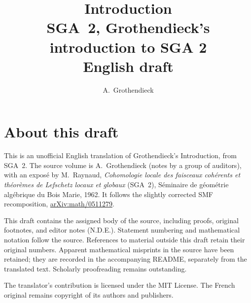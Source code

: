 \documentclass[11pt,a4paper,oneside]{amsbook}
\title[SGA~2, Grothendieck's introduction to SGA 2 (English draft)]{Introduction\\
{\normalsize SGA~2, Grothendieck's introduction to SGA 2\\English draft}}
\author{A.\ Grothendieck}
\date{}
\begin{document}
\frontmatter
\maketitle

\chapter*{About this draft}
This is an unofficial English translation of Grothendieck's Introduction,
from SGA~2. The source volume is A.\ Grothendieck
(notes by a group of auditors), with an expos\'e by M.\ Raynaud,
\textit{Cohomologie locale des faisceaux coh\'erents et th\'eor\`emes
de Lefschetz locaux et globaux} (SGA~2), S\'eminaire de g\'eom\'etrie
alg\'ebrique du Bois Marie, 1962. It follows the slightly corrected
SMF recomposition,
\href{https://arxiv.org/abs/math/0511279}{arXiv:math/0511279}.

This draft contains the assigned body of the source, including proofs,
original footnotes, and editor notes (N.D.E.). Statement numbering and
mathematical notation follow the source. References to material outside
this draft retain their original numbers. Apparent mathematical
misprints in the source have been retained; they are recorded in the
accompanying README, separately from the translated text. Scholarly
proofreading remains outstanding.

The translator's contribution is licensed under
the MIT License.
The French original remains copyright of its authors and publishers.

\tableofcontents
\mainmatter

\end{document}
